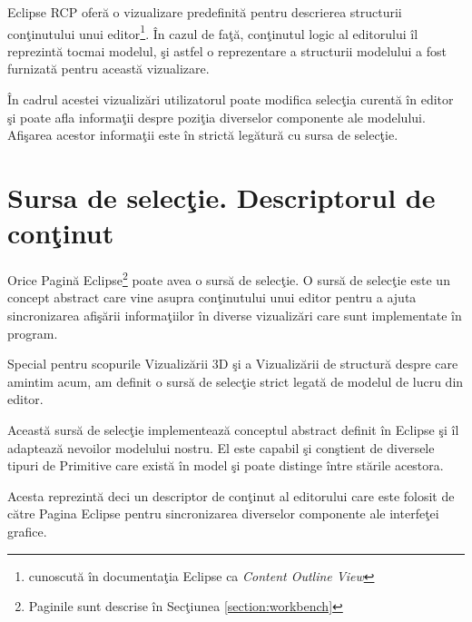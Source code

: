 Eclipse RCP oferă o vizualizare predefinită pentru descrierea structurii 
conţinutului unui editor\footnote{cunoscută în documentaţia Eclipse ca 
\textit{Content Outline View}}. În cazul de faţă, conţinutul logic al 
editorului îl reprezintă tocmai modelul, şi astfel o reprezentare a structurii 
modelului a fost furnizată pentru această vizualizare.

În cadrul acestei vizualizări utilizatorul poate modifica selecţia curentă în
editor şi poate afla informaţii despre poziţia diverselor componente ale
modelului. Afişarea acestor informaţii este în strictă legătură cu sursa de
selecţie.

\section{Sursa de selecţie. Descriptorul de conţinut}

Orice Pagină Eclipse\footnote{Paginile sunt descrise în Secţiunea
\ref{section:workbench}} poate avea o sursă de selecţie. O sursă de selecţie
este un concept abstract care vine asupra conţinutului unui editor pentru a
ajuta sincronizarea afişării informaţiilor în diverse vizualizări care sunt
implementate în program.

Special pentru scopurile Vizualizării 3D şi a Vizualizării de structură despre
care amintim acum, am definit o sursă de selecţie strict legată de modelul de
lucru din editor.

Această sursă de selecţie implementează conceptul abstract definit în Eclipse şi
îl adaptează nevoilor modelului nostru. El este capabil şi conştient de
diversele tipuri de Primitive care există în model şi poate distinge între
stările acestora.

Acesta reprezintă deci un descriptor de conţinut al editorului care este folosit
de către Pagina Eclipse pentru sincronizarea diverselor componente ale
interfeţei grafice.
